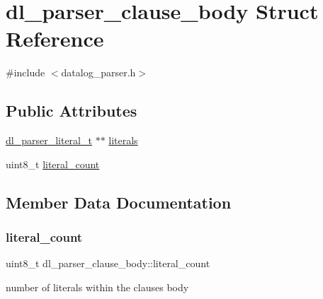 \hypertarget{structdl__parser__clause__body}{}\section{dl\+\_\+parser\+\_\+clause\+\_\+body Struct Reference}
\label{structdl__parser__clause__body}


{\ttfamily \#include $<$datalog\+\_\+parser.\+h$>$}

\subsection*{Public Attributes}
\begin{DoxyCompactItemize}
\item 
\hyperlink{datalog__parser_8h_adaef2eede58b9f7698925f7194af1373}{dl\+\_\+parser\+\_\+literal\+\_\+t} $\ast$$\ast$ \hyperlink{structdl__parser__clause__body_ac0e5f02f4945d0b0f4b295dad8a9f0a4}{literals}
\item 
uint8\+\_\+t \hyperlink{structdl__parser__clause__body_a5e0dedd1c1f24ab3bf32794241ed3001}{literal\+\_\+count}
\end{DoxyCompactItemize}


\subsection{Member Data Documentation}
\mbox{\label{structdl__parser__clause__body_a5e0dedd1c1f24ab3bf32794241ed3001}} 
\subsubsection{\texorpdfstring{literal\+\_\+count}{literal\_count}}
{\footnotesize\ttfamily uint8\+\_\+t dl\+\_\+parser\+\_\+clause\+\_\+body\+::literal\+\_\+count}

number of literals within the clause\textquotesingle{}s body \mbox{\label{structdl__parser__clause__body_ac0e5f02f4945d0b0f4b295dad8a9f0a4}} 
